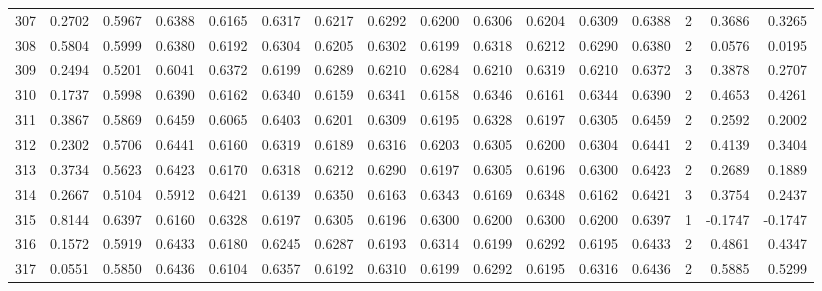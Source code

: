 \begin{tabular}{lrrrrrrrrrrrrrrr}
307 &      0.2702 &  0.5967 &  0.6388 &  0.6165 &  0.6317 &  0.6217 &  0.6292 &  0.6200 &  0.6306 &  0.6204 &   0.6309 &     0.6388 &      2 &                    0.3686 &                     0.3265 \\
308 &      0.5804 &  0.5999 &  0.6380 &  0.6192 &  0.6304 &  0.6205 &  0.6302 &  0.6199 &  0.6318 &  0.6212 &   0.6290 &     0.6380 &      2 &                    0.0576 &                     0.0195 \\
309 &      0.2494 &  0.5201 &  0.6041 &  0.6372 &  0.6199 &  0.6289 &  0.6210 &  0.6284 &  0.6210 &  0.6319 &   0.6210 &     0.6372 &      3 &                    0.3878 &                     0.2707 \\
310 &      0.1737 &  0.5998 &  0.6390 &  0.6162 &  0.6340 &  0.6159 &  0.6341 &  0.6158 &  0.6346 &  0.6161 &   0.6344 &     0.6390 &      2 &                    0.4653 &                     0.4261 \\
311 &      0.3867 &  0.5869 &  0.6459 &  0.6065 &  0.6403 &  0.6201 &  0.6309 &  0.6195 &  0.6328 &  0.6197 &   0.6305 &     0.6459 &      2 &                    0.2592 &                     0.2002 \\
312 &      0.2302 &  0.5706 &  0.6441 &  0.6160 &  0.6319 &  0.6189 &  0.6316 &  0.6203 &  0.6305 &  0.6200 &   0.6304 &     0.6441 &      2 &                    0.4139 &                     0.3404 \\
313 &      0.3734 &  0.5623 &  0.6423 &  0.6170 &  0.6318 &  0.6212 &  0.6290 &  0.6197 &  0.6305 &  0.6196 &   0.6300 &     0.6423 &      2 &                    0.2689 &                     0.1889 \\
314 &      0.2667 &  0.5104 &  0.5912 &  0.6421 &  0.6139 &  0.6350 &  0.6163 &  0.6343 &  0.6169 &  0.6348 &   0.6162 &     0.6421 &      3 &                    0.3754 &                     0.2437 \\
315 &      0.8144 &  0.6397 &  0.6160 &  0.6328 &  0.6197 &  0.6305 &  0.6196 &  0.6300 &  0.6200 &  0.6300 &   0.6200 &     0.6397 &      1 &                   -0.1747 &                    -0.1747 \\
316 &      0.1572 &  0.5919 &  0.6433 &  0.6180 &  0.6245 &  0.6287 &  0.6193 &  0.6314 &  0.6199 &  0.6292 &   0.6195 &     0.6433 &      2 &                    0.4861 &                     0.4347 \\
317 &      0.0551 &  0.5850 &  0.6436 &  0.6104 &  0.6357 &  0.6192 &  0.6310 &  0.6199 &  0.6292 &  0.6195 &   0.6316 &     0.6436 &      2 &                    0.5885 &                     0.5299 \\

\end{tabular}
